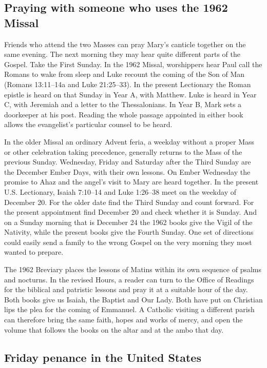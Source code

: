 \subsection{Praying with someone who uses the 1962 Missal}

Friends who attend the two Masses can pray Mary's canticle together on the same evening. The next morning they may hear quite different parts of the Gospel. Take the First Sunday. In the 1962 Missal, worshippers hear Paul call the Romans to wake from sleep and Luke recount the coming of the Son of Man (Romans 13:11--14a and Luke 21:25--33). In the present Lectionary the Roman epistle is heard on that Sunday in Year A, with Matthew. Luke is heard in Year C, with Jeremiah and a letter to the Thessalonians. In Year B, Mark sets a doorkeeper at his post. Reading the whole passage appointed in either book allows the evangelist's particular counsel to be heard.

In the older Missal an ordinary Advent feria, a weekday without a proper Mass or other celebration taking precedence, generally returns to the Mass of the previous Sunday. Wednesday, Friday and Saturday after the Third Sunday are the December Ember Days, with their own lessons. On Ember Wednesday the promise to Ahaz and the angel's visit to Mary are heard together. In the present U.S. Lectionary, Isaiah 7:10--14 and Luke 1:26--38 meet on the weekday of December 20. For the older date find the Third Sunday and count forward. For the present appointment find December 20 and check whether it is Sunday. And on a Sunday morning that is December 24 the 1962 books give the Vigil of the Nativity, while the present books give the Fourth Sunday. One set of directions could easily send a family to the wrong Gospel on the very morning they most wanted to prepare.

The 1962 Breviary places the lessons of Matins within its own sequence of psalms and nocturns. In the revised Hours, a reader can turn to the Office of Readings for the biblical and patristic lessons and pray it at a suitable hour of the day. Both books give us Isaiah, the Baptist and Our Lady. Both have put on Christian lips the plea for the coming of Emmanuel. A Catholic visiting a different parish can therefore bring the same faith, hopes and works of mercy, and open the volume that follows the books on the altar and at the ambo that day.

\subsection{Friday penance in the United States}

